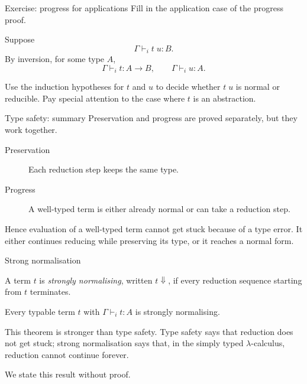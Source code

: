 \begin{frame}{Exercise: progress for applications}
  Fill in the application case of the progress proof.

  Suppose
  \[
    \Gamma \vdash_i t\;u : B.
  \]
  By inversion, for some type $A$,
  \[
    \Gamma \vdash_i t : A \to B,
    \qquad
    \Gamma \vdash_i u : A.
  \]

  Use the induction hypotheses for $t$ and $u$ to decide whether $t\;u$ is
  normal or reducible.  Pay special attention to the case where $t$ is an
  abstraction.
\end{frame}

\begin{frame}{Type safety: summary}
  Preservation and progress are proved separately, but they work together.

  \begin{description}
    \item[Preservation]
      Each reduction step keeps the same type.

    \item[Progress]
      A well-typed term is either already normal or can take a reduction step.
  \end{description}

  \vfill

  Hence evaluation of a well-typed term cannot get stuck because of a type
  error.  It either continues reducing while preserving its type, or it reaches
  a normal form.
\end{frame}

\begin{frame}{Strong normalisation}
  \begin{definition}
    A term $t$ is \emph{strongly normalising}, written $t \Downarrow$, if every
    reduction sequence starting from $t$ terminates.
  \end{definition}

  \begin{theorem}
    Every typable term $t$ with $\Gamma \vdash_i t : A$ is strongly normalising.
  \end{theorem}

  \vfill

  This theorem is stronger than type safety.  Type safety says that reduction
  does not get stuck; strong normalisation says that, in the simply typed
  $\lambda$-calculus, reduction cannot continue forever.

  \medskip

  We state this result without proof.
\end{frame}

